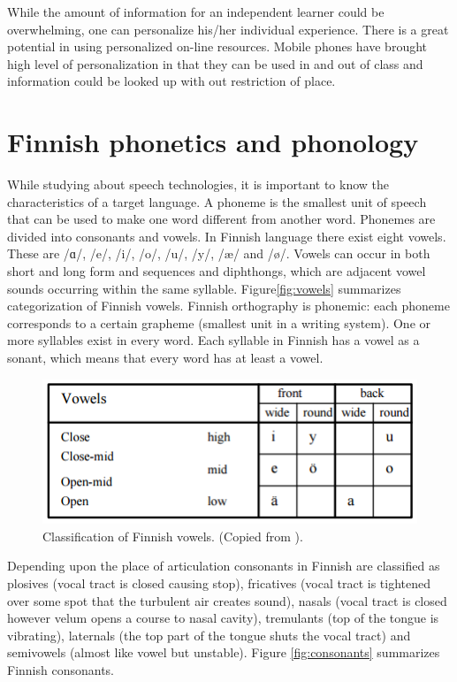 \documentclass[11pt,a4paper,oneside,article]{memoir}
\begin{document}
While the amount of information for an independent learner could be overwhelming, one can personalize his/her individual experience. There is a great potential in using personalized on-line resources. Mobile phones have brought high level of personalization in that they can be used in and out of class and information could be looked up with out restriction of place.

\section{Finnish phonetics and phonology}
While studying about speech technologies, it is important to know the characteristics of a target language. A phoneme is the smallest unit of speech that can be used to make one word different from another word. Phonemes are divided into consonants and vowels. In Finnish language there exist eight vowels. These are  /ɑ/, /e/, /i/, /o/, /u/, /y/, /æ/ and /ø/. Vowels can occur in both short and long form and sequences and diphthongs, which are adjacent vowel sounds occurring within the same syllable.\cite{silen} Figure\vref{fig:vowels} summarizes categorization of Finnish vowels.
Finnish orthography is phonemic: each phoneme corresponds to a certain grapheme (smallest unit in a writing system). One or more syllables exist in every word. Each syllable in Finnish has a vowel as a sonant, which means that every word has at least a vowel. 

\begin{figure}[h]
  \includegraphics[width=12cm]{vowels}
  \caption{Classification of Finnish vowels. (Copied from \cite{hut}).}
  \label{fig:vowels}
\end{figure}

Depending upon the place of articulation consonants in Finnish are classified as plosives (vocal tract is closed causing stop), fricatives (vocal tract is tightened over some spot that the turbulent air creates sound), nasals (vocal tract is closed however velum opens a course to nasal cavity), tremulants (top of the tongue is vibrating), laternals (the top part of the tongue shuts the vocal tract) and semivowels (almost like vowel but unstable). Figure \vref{fig:consonants} summarizes Finnish consonants.\cite{hut}
\end{document}
